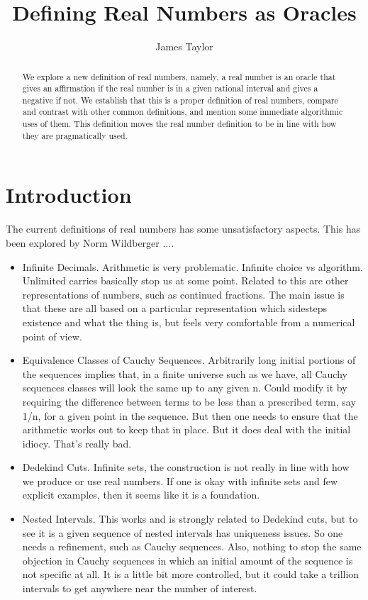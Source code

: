\documentclass[12pt]{article}
\title{Defining Real Numbers as Oracles}
\author{
  James Taylor
}
\begin{document}
\maketitle
\begin{abstract}
We explore a new definition of real numbers, namely, a real number is an oracle that gives an affirmation if the real number is in a given rational interval and gives a negative if not. We establish that this is a proper definition of real numbers, compare and contrast with other common definitions, and mention some immediate algorithmic uses of them. This definition moves the real number definition to be in line with how they are pragmatically used. 
\end{abstract}





\section{Introduction}


The current definitions of real numbers has some unsatisfactory aspects. This
has been explored by Norm Wildberger ....

\begin{itemize}
    \item Infinite Decimals. Arithmetic is very problematic. Infinite choice vs
  algorithm. Unlimited carries basically stop us at some point. Related to
  this are other representations of numbers, such as continued fractions. The
  main issue is that these are all based on a particular representation which
  sidesteps existence and what the thing is, but feels very comfortable from a
  numerical point of view. 
  \item Equivalence Classes of Cauchy Sequences. Arbitrarily long initial portions
  of the sequences implies that, in a finite universe such as we have, all
  Cauchy sequences classes will look the same up to any given n. Could modify
  it by requiring the difference between terms to be less than a prescribed
  term, say 1/n, for a given point in the sequence. But then one needs to
  ensure that the arithmetic works out to keep that in place. But it does deal
  with the initial idiocy. That's really bad. 
  \item Dedekind Cuts. Infinite sets, the construction is not really in line with
  how we produce or use real numbers. If one is okay with infinite sets and
  few explicit examples, then it seems like it is a foundation. 
  \item Nested Intervals. This works and is strongly related to Dedekind cuts, but
  to see it is a given sequence of nested intervals has uniqueness issues. So
  one needs a refinement, such as Cauchy sequences. Also, nothing to stop the
  same objection in Cauchy sequences in which an initial amount of the
  sequence is not specific at all. It is a little bit more controlled, but it
  could take a trillion intervals to get anywhere near the number of interest.
\end{itemize}
\end{document}
